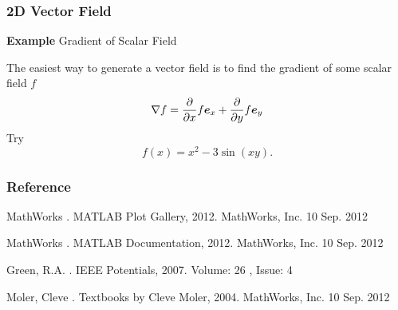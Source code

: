 \documentclass[compress]{beamer}  %
\begin{document}
\begin{frame}[fragile]
\frametitle{2D Vector Field}
\textbf{Example} Gradient of Scalar Field

The easiest way to generate a vector field is to find the gradient of some scalar field $f$
\begin{equation}
    \nabla f = \frac{\partial}{\partial x} f \boldsymbol{e}_x + \frac{\partial}{\partial y} f \boldsymbol{e}_y 
\end{equation}
\pause
Try
\begin{equation}
    f(x) = x^2 - 3\sin(xy).
\end{equation}

\begin{figure}
    \centering
\end{figure}

\end{frame}
\begin{frame}[allowframebreaks]
\frametitle{Reference}
  \begin{thebibliography}{10}    
    MathWorks
    .
    \newblock MATLAB Plot Gallery, 2012. MathWorks, Inc. 10 Sep. 2012
  \end{thebibliography}

  \begin{thebibliography}{10}    
    MathWorks
    .
    \newblock MATLAB Documentation, 2012. MathWorks, Inc. 10 Sep. 2012
  \end{thebibliography}

  \begin{thebibliography}{10}    
    Green, R.A. 
    .
    \newblock IEEE Potentials, 2007. Volume: 26 , Issue: 4 
  \end{thebibliography}
  
  \begin{thebibliography}{10}    
    Moler, Cleve
    .
    \newblock Textbooks by Cleve Moler, 2004. MathWorks, Inc. 10 Sep. 2012
  \end{thebibliography}
  
\end{frame}
\end{document}
